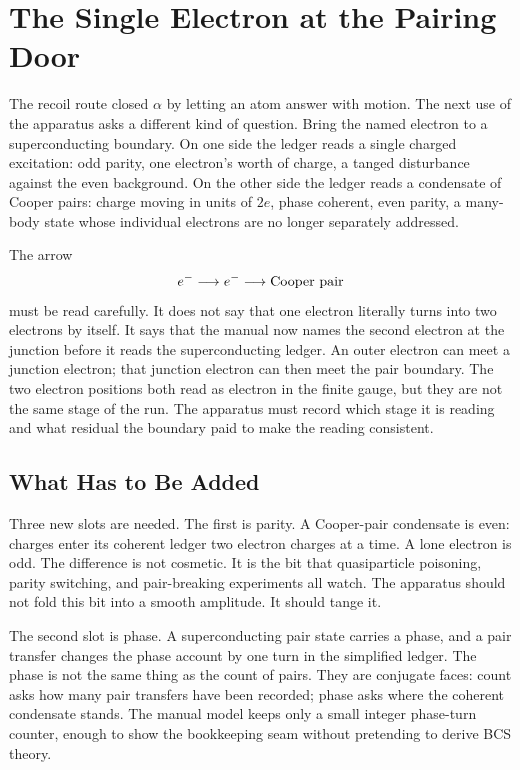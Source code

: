 \chapter{The Single Electron at the Pairing Door}

The recoil route closed \(\alpha\) by letting an atom answer with motion. The next use of the apparatus asks a
different kind of question. Bring the named electron to a superconducting boundary. On one side the ledger reads
a single charged excitation: odd parity, one electron's worth of charge, a tanged disturbance against the even
background. On the other side the ledger reads a condensate of Cooper pairs: charge moving in units of \(2e\),
phase coherent, even parity, a many-body state whose individual electrons are no longer separately addressed.

The arrow
\[
  e^- \longrightarrow e^- \longrightarrow \hbox{Cooper pair}
\]
must be read carefully. It does not say that one electron literally turns into two electrons by itself. It says
that the manual now names the second electron at the junction before it reads the superconducting ledger. An
outer electron can meet a junction electron; that junction electron can then meet the pair boundary. The two
electron positions both read as electron in the finite gauge, but they are not the same stage of the run. The
apparatus must record which stage it is reading and what residual the boundary paid to make the reading
consistent.

\section{What Has to Be Added}

Three new slots are needed. The first is parity. A Cooper-pair condensate is even: charges enter its coherent
ledger two electron charges at a time. A lone electron is odd. The difference is not cosmetic. It is the bit that
quasiparticle poisoning, parity switching, and pair-breaking experiments all watch. The apparatus should not
fold this bit into a smooth amplitude. It should tange it.

The second slot is phase. A superconducting pair state carries a phase, and a pair transfer changes the phase
account by one turn in the simplified ledger. The phase is not the same thing as the count of pairs. They are
conjugate faces: count asks how many pair transfers have been recorded; phase asks where the coherent condensate
stands. The manual model keeps only a small integer phase-turn counter, enough to show the bookkeeping seam
without pretending to derive BCS theory.

